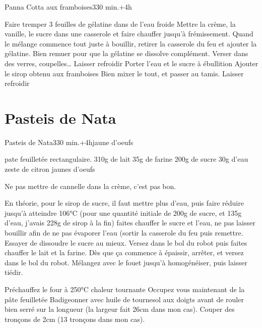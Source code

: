 {\begin{recette}{Panna Cotta aux framboises}{3}{30 min.+4h}{}
\begin{preparation}
\etape Faire tremper 3 feuilles de gélatine dans de l'eau froide
\etape Mettre la crème, la vanille, le sucre dans une casserole et faire chauffer jusqu'à frémissement.
\etape Quand le mélange commence tout juste à bouillir, retirer la casserole du feu et ajouter la gélatine. Bien remuer pour que 
la gélatine se dissolve complément.
\etape Verser dans des verres, coupelles…
\etape Laisser refroidir
\etape Porter l'eau et le sucre à ébullition
\etape Ajouter le sirop obtenu aux framboises
\etape Bien mixer le tout, et passer au tamis.
\etape Laisser refroidir
\end{preparation}
\end{recette}


\section{Pasteis de Nata}
\begin{recette}{Pasteis de Nata}{3}{30 min.+4h}{jaune d'oeufs}
\begin{ingredients}
 pate feuilletée rectangulaire. 
\ingredient 310g de lait
\ingredient 35g de farine
\ingredient 200g de sucre
\ingredient 30g d'eau
\ingredient zeste de citron
 jaunes d'oeufs
\end{ingredients}

\begin{remarque}
Ne pas mettre de cannelle dans la crème, c'est pas bon.
\end{remarque}


\begin{preparation}
\etape En théorie, pour le sirop de sucre, il faut mettre plus d'eau, puis faire réduire jusqu'à atteindre 106°C (pour une quantité initiale de 200g de sucre, et 135g d'eau, j'avais 228g de sirop à la fin)
\etape faites chauffer le sucre et l'eau, ne pas laisser bouillir afin de ne pas évaporer l'eau (sortir la casserole du feu puis remettre. Essayer de dissoudre le sucre au mieux. Versez dans le bol du robot puis faites chauffer le lait et la farine. 
\etape Dès que ça commence à épaissir, arrêter, et versez dans le bol du robot. Mélangez avec le fouet jusqu'à homogénéiser, puis laisser tiédir. 

\etape Préchauffez le four à 250°C chaleur tournante
\etape Occupez vous maintenant de la pâte feuilletée
\etape Badigeonner avec huile de tournesol aux doigts avant de rouler bien serré sur la longueur (la largeur fait 26cm dans mon cas). 
\etape Couper des tronçons de 2cm (13 tronçons dans mon cas).


\end{preparation}
\end{recette}}
